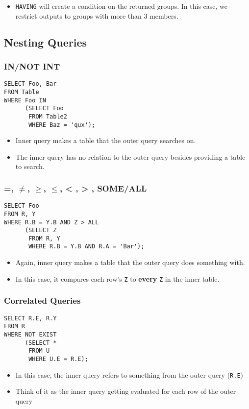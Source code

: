 \documentclass[11pt]{article}
\begin{document}
\begin{itemize}
\item \texttt{HAVING} will create a condition on the returned groups. In this case, we
restrict outputs to groups with more than 3 members.
\end{itemize}
\subsection{Nesting Queries}
\label{sec:org573b37a}
\subsubsection{IN/NOT INT}
\label{sec:orgdbc0b41}
\begin{verbatim}
SELECT Foo, Bar
FROM Table
WHERE Foo IN
      (SELECT Foo
       FROM Table2
       WHERE Baz = 'qux');
\end{verbatim}

\begin{itemize}
\item Inner query makes a table that the outer query searches on.
\item The inner query has no relation to the outer query besides providing a
table to search.
\end{itemize}
\subsubsection{=, \(\neq\), \(\ge\), \(\le\), < , > , SOME/ALL}
\label{sec:orgfc3b78a}
\begin{verbatim}
SELECT Foo
FROM R, Y
WHERE R.B = Y.B AND Z > ALL
      (SELECT Z
       FROM R, Y
       WHERE R.B = Y.B AND R.A = 'Bar');
\end{verbatim}

\begin{itemize}
\item Again, inner query makes a table that the outer query does something with.
\item In this case, it compares each row's \texttt{Z} to \textbf{every} \texttt{Z} in the inner
table.
\end{itemize}
\subsubsection{Correlated Queries}
\label{sec:org6a7a542}
\begin{verbatim}
SELECT R.E, R.Y
FROM R
WHERE NOT EXIST
      (SELECT *
       FROM U
       WHERE U.E = R.E);
\end{verbatim}

\begin{itemize}
\item In this case, the inner query refers to something from the outer query
(\texttt{R.E})
\item Think of it as the inner query getting evaluated for each row of the outer query
\end{itemize}
\end{document}
